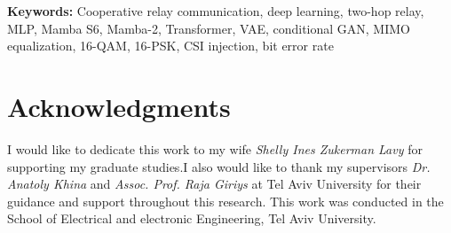 \textbf{Keywords:} Cooperative relay communication, deep learning, two-hop relay, MLP, Mamba S6, Mamba-2, Transformer, VAE, conditional GAN, MIMO equalization, 16-QAM, 16-PSK, CSI injection, bit error rate

\clearpage

\cleardoublepage
{}
\chapter*{Acknowledgments}

I would like to dedicate this work to my wife \textit{Shelly Ines Zukerman Lavy} for supporting my graduate studies.I also would like to thank my supervisors \textit{Dr. Anatoly Khina} and \textit{Assoc. Prof.  Raja Giriys} at Tel Aviv University for their guidance and support throughout this research. 
This work was conducted in the School of Electrical and electronic Engineering, Tel Aviv University.


